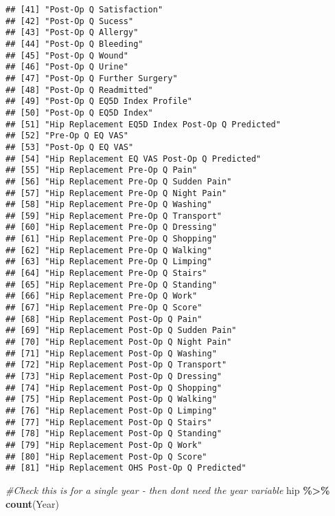 \documentclass[
]{article}
\newenvironment{Shaded}{\begin{snugshade}}{\end{snugshade}}
\newcommand{\CommentTok}[1]{\textcolor[rgb]{0.56,0.35,0.01}{\textit{#1}}}
\newcommand{\FunctionTok}[1]{\textcolor[rgb]{0.13,0.29,0.53}{\textbf{#1}}}
\newcommand{\NormalTok}[1]{#1}
\newcommand{\SpecialCharTok}[1]{\textcolor[rgb]{0.81,0.36,0.00}{\textbf{#1}}}
\begin{document}
\begin{verbatim}
## [41] "Post-Op Q Satisfaction"                        
## [42] "Post-Op Q Sucess"                              
## [43] "Post-Op Q Allergy"                             
## [44] "Post-Op Q Bleeding"                            
## [45] "Post-Op Q Wound"                               
## [46] "Post-Op Q Urine"                               
## [47] "Post-Op Q Further Surgery"                     
## [48] "Post-Op Q Readmitted"                          
## [49] "Post-Op Q EQ5D Index Profile"                  
## [50] "Post-Op Q EQ5D Index"                          
## [51] "Hip Replacement EQ5D Index Post-Op Q Predicted"
## [52] "Pre-Op Q EQ VAS"                               
## [53] "Post-Op Q EQ VAS"                              
## [54] "Hip Replacement EQ VAS Post-Op Q Predicted"    
## [55] "Hip Replacement Pre-Op Q Pain"                 
## [56] "Hip Replacement Pre-Op Q Sudden Pain"          
## [57] "Hip Replacement Pre-Op Q Night Pain"           
## [58] "Hip Replacement Pre-Op Q Washing"              
## [59] "Hip Replacement Pre-Op Q Transport"            
## [60] "Hip Replacement Pre-Op Q Dressing"             
## [61] "Hip Replacement Pre-Op Q Shopping"             
## [62] "Hip Replacement Pre-Op Q Walking"              
## [63] "Hip Replacement Pre-Op Q Limping"              
## [64] "Hip Replacement Pre-Op Q Stairs"               
## [65] "Hip Replacement Pre-Op Q Standing"             
## [66] "Hip Replacement Pre-Op Q Work"                 
## [67] "Hip Replacement Pre-Op Q Score"                
## [68] "Hip Replacement Post-Op Q Pain"                
## [69] "Hip Replacement Post-Op Q Sudden Pain"         
## [70] "Hip Replacement Post-Op Q Night Pain"          
## [71] "Hip Replacement Post-Op Q Washing"             
## [72] "Hip Replacement Post-Op Q Transport"           
## [73] "Hip Replacement Post-Op Q Dressing"            
## [74] "Hip Replacement Post-Op Q Shopping"            
## [75] "Hip Replacement Post-Op Q Walking"             
## [76] "Hip Replacement Post-Op Q Limping"             
## [77] "Hip Replacement Post-Op Q Stairs"              
## [78] "Hip Replacement Post-Op Q Standing"            
## [79] "Hip Replacement Post-Op Q Work"                
## [80] "Hip Replacement Post-Op Q Score"               
## [81] "Hip Replacement OHS Post-Op Q Predicted"
\end{verbatim}

\begin{Shaded}
\begin{Highlighting}[]
\CommentTok{\#Check this is for a single year {-} then dont need the year variable}
\NormalTok{hip }\SpecialCharTok{\%\textgreater{}\%} 
\FunctionTok{count}\NormalTok{(Year)}
\end{Highlighting}
\end{Shaded}
\end{document}
